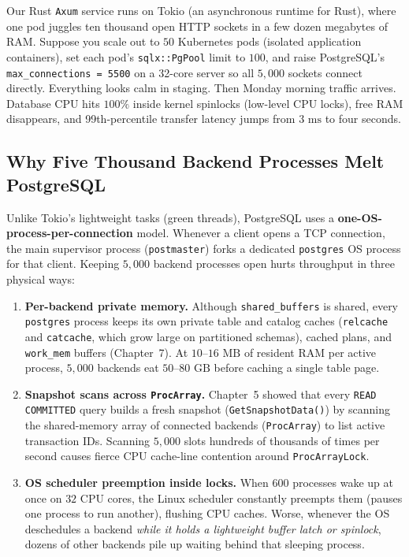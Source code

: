 Our Rust \texttt{Axum} service runs on Tokio (an asynchronous runtime for Rust), where one pod juggles
ten thousand open HTTP sockets in a few dozen megabytes of RAM. Suppose you scale
out to $50$ Kubernetes pods (isolated application containers), set each pod's \texttt{sqlx::PgPool} limit to $100$,
and raise PostgreSQL's \texttt{max\_connections = 5500} on a 32-core server so all
$5{,}000$ sockets connect directly. Everything looks calm in staging. Then Monday
morning traffic arrives. Database CPU hits $100\%$ inside kernel spinlocks (low-level CPU locks), free
RAM disappears, and 99th-percentile transfer latency jumps from $3\text{ ms}$ to
four seconds.

\subsection{Why Five Thousand Backend Processes Melt PostgreSQL}
\label{ch08:process-model}

Unlike Tokio's lightweight tasks (green threads), PostgreSQL uses a
\textbf{one-OS-process-per-connection} model. Whenever a client opens a TCP
connection, the main supervisor process (\texttt{postmaster}) forks a dedicated
\texttt{postgres} OS process for that client. Keeping $5{,}000$ backend processes
open hurts throughput in three physical ways:

\begin{enumerate}
  \item \textbf{Per-backend private memory.} Although \texttt{shared\_buffers} is
    shared, every \texttt{postgres} process keeps its own private table and catalog
    caches (\texttt{relcache} and \texttt{catcache}, which grow large on
    partitioned schemas), cached plans, and \texttt{work\_mem} buffers (Chapter~7).
    At $10$--$16\text{ MB}$ of resident RAM per active process, $5{,}000$ backends
    eat $50$--$80\text{ GB}$ before caching a single table page.
  \item \textbf{Snapshot scans across \texttt{ProcArray}.} Chapter~5 showed that
    every \texttt{READ COMMITTED} query builds a fresh snapshot
    (\texttt{GetSnapshotData()}) by scanning the shared-memory array of connected
    backends (\texttt{ProcArray}) to list active transaction IDs. Scanning $5{,}000$
    slots hundreds of thousands of times per second causes fierce CPU cache-line
    contention around \texttt{ProcArrayLock}.
  \item \textbf{OS scheduler preemption inside locks.} When $600$ processes wake up
    at once on $32$ CPU cores, the Linux scheduler constantly preempts them (pauses one process to run another),
    flushing CPU caches. Worse, whenever the OS deschedules a backend \emph{while
    it holds a lightweight buffer latch or spinlock}, dozens of other backends pile
    up waiting behind that sleeping process.
\end{enumerate}

